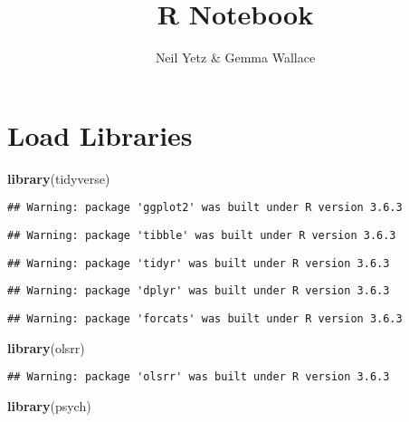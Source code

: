 \documentclass[]{article}
\title{R Notebook}
\author{Neil Yetz \& Gemma Wallace}
\date{}
\newenvironment{Shaded}{\begin{snugshade}}{\end{snugshade}}
\newcommand{\KeywordTok}[1]{\textcolor[rgb]{0.13,0.29,0.53}{\textbf{#1}}}
\newcommand{\NormalTok}[1]{#1}
\begin{document}
\maketitle

\section{Load Libraries}\label{load-libraries}

\begin{Shaded}
\begin{Highlighting}[]
\KeywordTok{library}\NormalTok{(tidyverse)}
\end{Highlighting}
\end{Shaded}

\begin{verbatim}
## Warning: package 'ggplot2' was built under R version 3.6.3
\end{verbatim}

\begin{verbatim}
## Warning: package 'tibble' was built under R version 3.6.3
\end{verbatim}

\begin{verbatim}
## Warning: package 'tidyr' was built under R version 3.6.3
\end{verbatim}

\begin{verbatim}
## Warning: package 'dplyr' was built under R version 3.6.3
\end{verbatim}

\begin{verbatim}
## Warning: package 'forcats' was built under R version 3.6.3
\end{verbatim}

\begin{Shaded}
\begin{Highlighting}[]
\KeywordTok{library}\NormalTok{(olsrr)}
\end{Highlighting}
\end{Shaded}

\begin{verbatim}
## Warning: package 'olsrr' was built under R version 3.6.3
\end{verbatim}

\begin{Shaded}
\begin{Highlighting}[]
\KeywordTok{library}\NormalTok{(psych) }
\end{Highlighting}
\end{Shaded}
\end{document}
